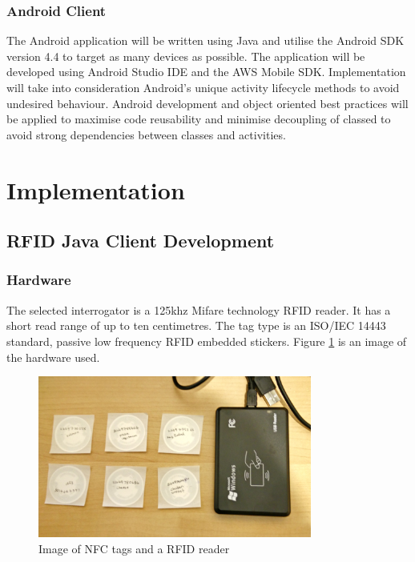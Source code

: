 \documentclass[a4paper, 11pt]{article}
\begin{document}
\subsubsection {Android Client}
The Android application will be written using Java and utilise the Android SDK version 4.4 to target as many devices as possible. The application will be developed using Android Studio IDE and the AWS Mobile SDK. Implementation will take into consideration Android's unique activity lifecycle methods to avoid undesired behaviour. Android development and object oriented best practices will be applied to maximise code reusability and minimise decoupling of classed to avoid strong dependencies between classes and activities.

\clearpage


\section{Implementation}

\subsection{RFID Java Client Development}
\subsubsection{Hardware}The selected interrogator is a 125khz Mifare technology RFID reader. It has a short read range of up to ten centimetres. The tag type is an ISO/IEC 14443 standard, passive low frequency RFID embedded stickers. Figure \ref{fig:RFID} is an image of the hardware used. 

\vspace{\baselineskip}

\begin{figure}[!hp]
\centering
\includegraphics[width=9cm]{rfid}
\caption{Image of NFC tags and a RFID reader} \label{fig:RFID}
\end{figure}
\end{document}
